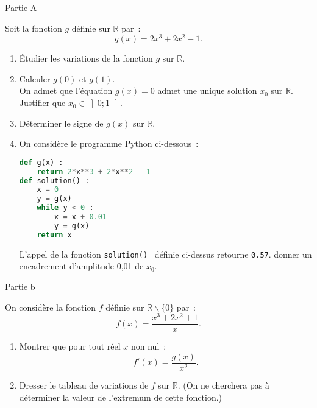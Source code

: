 
%
\begin{center}
     \begin{h3} Partie A \end{h3}
\end{center}
Soit la fonction $ g $ définie sur $  \mathbb{R}  $ par~:
\[
g (x) =2x^{ 3 } +2x^2  - 1.
\]
\begin{enumerate}
     \item
     Étudier les variations de la fonction $ g $ sur $  \mathbb{R} . $
     \item
     Calculer $ g (0)  $ et $ g (1).  $\\
     On admet que l'équation $ g (x) =0 $ admet une unique solution  $ x_{ 0 }  $ sur $  \mathbb{R}$.  \\
     Justifier que $ x_{ 0 }  \in  \left] 0 ; 1 \right[$.
     \item
     Déterminer le signe de $ g (x)  $ sur $  \mathbb{R}$.
     \item
     On considère le programme Python ci-dessous~:
\begin{lstlisting}[language=Python]
def g(x) :
    return 2*x**3 + 2*x**2 - 1
def solution() :
    x = 0
    y = g(x)
    while y < 0 :
        x = x + 0.01
        y = g(x)
    return x
\end{lstlisting}
L'appel de la fonction \texttt{solution() } définie ci-dessus retourne \texttt{0.57}.
\newpar
donner un encadrement d'amplitude 0,01 de  $ x_{ 0 }. $
\end{enumerate}
\begin{center}
     \begin{h3} Partie b \end{h3}
\end{center}
On considère la fonction $ f $ définie sur  $  \mathbb{R}  \backslash  \{ 0 \}  $ par~: \\
\[
f (x) = \frac{ x^{ 3 } +2x^2 +1 }{ x } .
\]
\begin{enumerate}
     \item
     Montrer que pour tout réel $ x $ non nul~:
     \[
     f'  (x)= \frac{ g (x)  }{ x^2  } .
     \]
     \item
     Dresser le tableau de variations de $ f $ sur $  \mathbb{R} . $  (On ne cherchera pas à déterminer la valeur de l’extremum de cette fonction.)
\end{enumerate}
%
